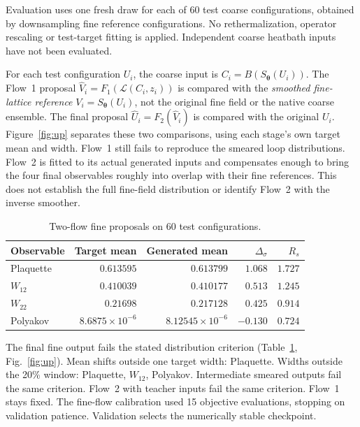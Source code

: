 \documentclass[aps,prd,superscriptaddress,nofootinbib,eqsecnum,floatfix,amsmath,longbibliography]{revtex4-2}
\begin{document}
Evaluation uses one fresh draw for each of 60 test coarse configurations,
obtained by downsampling fine reference configurations. No rethermalization,
operator rescaling or test-target fitting is applied. Independent coarse
heatbath inputs have not been evaluated.

For each test configuration $U_i$, the coarse input is
$C_i=B(S_{\bm\theta}(U_i))$. The Flow~1 proposal
$\widehat V_i=F_1(\mathcal L(C_i,z_i))$ is compared with the
\emph{smoothed fine-lattice reference} $V_i=S_{\bm\theta}(U_i)$,
not the original fine field or the native coarse ensemble.
The final proposal $\widehat U_i=F_2(\widehat V_i)$ is compared with
the original $U_i$. Figure~\ref{fig:up} separates these two comparisons,
using each stage's own target mean and width.
Flow~1 still fails to reproduce the smeared loop distributions. Flow~2 is
fitted to its actual generated inputs and compensates enough to bring the
four final observables roughly into overlap with their fine references.
This does not establish the full fine-field distribution or identify Flow~2
with the inverse smoother.

\begin{table}[t]
\caption{Two-flow fine proposals on 60 test configurations.}
\label{tab:up}\small\begin{tabular}{lrrrr}\toprule
Observable & Target mean & Generated mean & $\Delta_\sigma$ & $R_s$\\\midrule
Plaquette & $0.613595$ & $0.613799$ & $1.068$ & $1.727$\\
$W_{12}$ & $0.410039$ & $0.410177$ & $0.513$ & $1.245$\\
$W_{22}$ & $0.21698$ & $0.217128$ & $0.425$ & $0.914$\\
Polyakov & $8.6875\times10^{-6}$ & $8.12545\times10^{-6}$ & $-0.130$ & $0.724$\\
\bottomrule\end{tabular}\end{table}
The final fine output fails the stated distribution criterion (Table~\ref{tab:up}, Fig.~\ref{fig:up}).
Mean shifts outside one target width: Plaquette.
Widths outside the 20\% window: Plaquette, $W_{12}$, Polyakov.
Intermediate smeared outputs fail the same criterion.
Flow~2 with teacher inputs fail the same criterion.
Flow~1 stays fixed. The fine-flow calibration used 15 objective evaluations, stopping on validation patience. Validation selects the numerically stable checkpoint.
\end{document}
